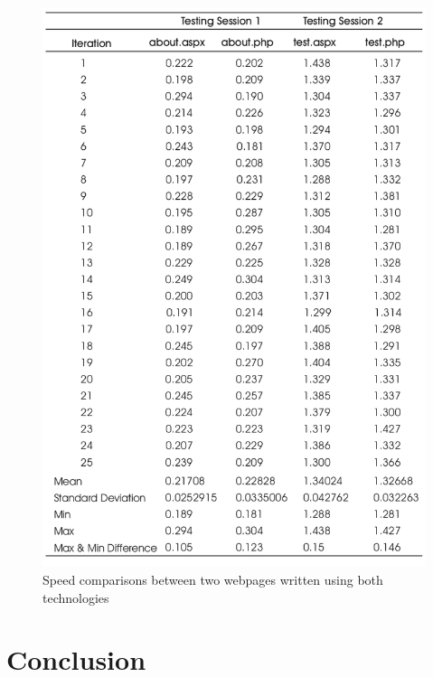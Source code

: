\documentclass[11]{article}
\begin{document}
\begin{figure}[H]

	\begin{center}
			\includegraphics[scale = 0.5]{speedComp.png}
	\end{center}
	\caption{Speed comparisons between two webpages written using both technologies}
	\label{speedFig}

\end{figure}


\pagebreak

\section{Conclusion}
	
\end{document}
